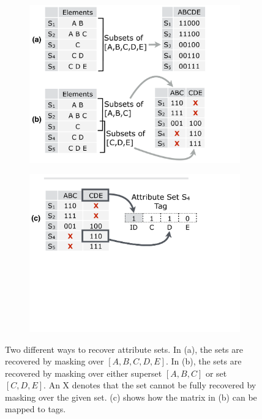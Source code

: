 \begin{figure}[t!] \begin{minipage}{1\linewidth}
\begin{subfigure}[b]{0.96\linewidth} \includegraphics[trim={0 0 5.5cm 0}, clip,
width=\linewidth]{figures/masking} \end{subfigure}
\begin{subfigure}[c]{0.96\linewidth} \includegraphics[trim={0 13cm 5.5cm 0},
clip, width=\linewidth]{figures/making_metadata} \end{subfigure} \end{minipage}
\caption{Two different ways to recover attribute sets.
In (a), the sets are recovered by masking over $[A,B,C,D,E]$. In (b), the sets
are recovered by masking over either superset $[A,B,C]$ or set $[C,D,E]$. An X
denotes that the set cannot be fully recovered by masking over the given set.
(c) shows how the matrix in (b) can be mapped to tags.}
\label{fig:masking} \end{figure}

